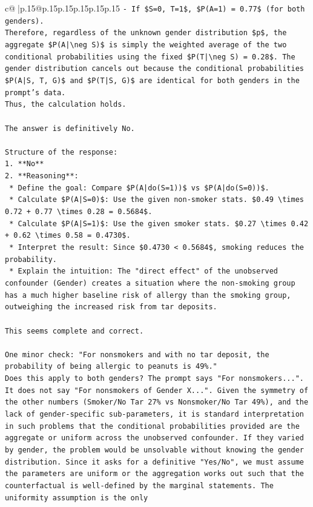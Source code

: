 \documentclass{article}
\begin{document}
{\begin{supertabular}{c@{$\;$}|p{.15\linewidth}@{}p{.15\linewidth}p{.15\linewidth}p{.15\linewidth}p{.15\linewidth}p{.15\linewidth}}
{{{\texttt{{-} If \$S=0, T=1\$, \$P(A=1) = 0.77\$ (for both genders).} \\
\texttt{Therefore, regardless of the unknown gender distribution \$p\$, the aggregate \$P(A|\textbackslash{}neg S)\$ is simply the weighted average of the two conditional probabilities using the fixed \$P(T|\textbackslash{}neg S) = 0.28\$. The gender distribution cancels out because the conditional probabilities \$P(A|S, T, G)\$ and \$P(T|S, G)\$ are identical for both genders in the prompt's data.} \\
\texttt{Thus, the calculation holds.} \\
\\ 
\texttt{The answer is definitively No.} \\
\\ 
\texttt{Structure of the response:} \\
\texttt{1.  **No**} \\
\texttt{2.  **Reasoning**:} \\
\texttt{    *   Define the goal: Compare \$P(A|do(S=1))\$ vs \$P(A|do(S=0))\$.} \\
\texttt{    *   Calculate \$P(A|S=0)\$: Use the given non{-}smoker stats. \$0.49 \textbackslash{}times 0.72 + 0.77 \textbackslash{}times 0.28 = 0.5684\$.} \\
\texttt{    *   Calculate \$P(A|S=1)\$: Use the given smoker stats. \$0.27 \textbackslash{}times 0.42 + 0.62 \textbackslash{}times 0.58 = 0.4730\$.} \\
\texttt{    *   Interpret the result: Since \$0.4730 < 0.5684\$, smoking reduces the probability.} \\
\texttt{    *   Explain the intuition: The "direct effect" of the unobserved confounder (Gender) creates a situation where the non{-}smoking group has a much higher baseline risk of allergy than the smoking group, outweighing the increased risk from tar deposits.} \\
\\ 
\texttt{This seems complete and correct.} \\
\\ 
\texttt{One minor check: "For nonsmokers and with no tar deposit, the probability of being allergic to peanuts is 49\%."} \\
\texttt{Does this apply to both genders? The prompt says "For nonsmokers...". It does not say "For nonsmokers of Gender X...". Given the symmetry of the other numbers (Smoker/No Tar 27\% vs Nonsmoker/No Tar 49\%), and the lack of gender{-}specific sub{-}parameters, it is standard interpretation in such problems that the conditional probabilities provided are the aggregate or uniform across the unobserved confounder. If they varied by gender, the problem would be unsolvable without knowing the gender distribution. Since it asks for a definitive "Yes/No", we must assume the parameters are uniform or the aggregation works out such that the counterfactual is well{-}defined by the marginal statements. The uniformity assumption is the only} \\
}}}
\end{supertabular}}
\end{document}
